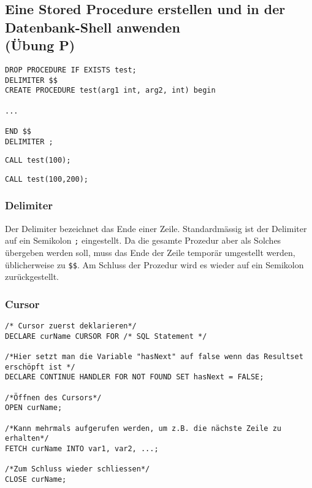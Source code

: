 \subsection{Eine Stored Procedure erstellen und in der Datenbank-Shell anwenden \\ (Übung P)}

\begin{lstlisting}[caption={Grundgerüst Stored Procedure},label=lst:gerüst_storedprocedure]
DROP PROCEDURE IF EXISTS test;
DELIMITER $$
CREATE PROCEDURE test(arg1 int, arg2, int) begin

...

END $$
DELIMITER ;
\end{lstlisting}


\begin{lstlisting}[caption={Aufruf Stored Procedure},label=lst:aufruf_storedprocedure]
CALL test(100);
\end{lstlisting}


\begin{lstlisting}[caption={Aufruf Stored Procedure},label=lst:aufruf_storedprocedure]
CALL test(100,200);
\end{lstlisting}

\subsubsection{Delimiter}
Der Delimiter bezeichnet das Ende einer Zeile. Standardmässig ist der Delimiter auf ein Semikolon \verb|;| eingestellt. Da die gesamte Prozedur aber als Solches übergeben werden soll, muss das Ende der Zeile temporär umgestellt werden, üblicherweise zu \verb|$$|. Am Schluss der Prozedur wird es wieder auf ein Semikolon zurückgestellt.

\subsubsection{Cursor}

\begin{lstlisting}[caption={Verwendung vom Cursor},label=lst:cursor_verwendung]
/* Cursor zuerst deklarieren*/
DECLARE curName CURSOR FOR /* SQL Statement */
    
/*Hier setzt man die Variable "hasNext" auf false wenn das Resultset erschöpft ist */
DECLARE CONTINUE HANDLER FOR NOT FOUND SET hasNext = FALSE;

/*Öffnen des Cursors*/
OPEN curName;

/*Kann mehrmals aufgerufen werden, um z.B. die nächste Zeile zu erhalten*/
FETCH curName INTO var1, var2, ...;
    
/*Zum Schluss wieder schliessen*/
CLOSE curName;
\end{lstlisting}

